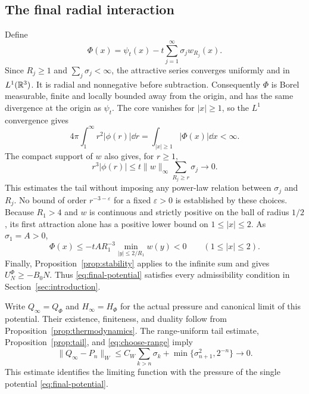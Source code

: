 \subsection{The final radial interaction}
Define
\begin{equation}\label{eq:final-potential}
 \Phi(x)=\psi_t(x)-t\sum_{j=1}^{\infty}\sigma_jw_{R_j}(x).
\end{equation}
Since $R_j\ge1$ and $\sum_j\sigma_j<\infty$, the attractive series
converges uniformly and in $L^1(\mathbb R^3)$. It is radial and nonnegative before
subtraction. Consequently $\Phi$ is Borel measurable, finite and locally
bounded away from the origin, and has the same divergence at the origin as
$\psi_t$. The core vanishes for $|x|\ge1$, so the $L^1$ convergence gives
\[
 4\pi\int_1^\infty r^2|\phi(r)|\dd r
 =\int_{|x|\ge1}|\Phi(x)|\dd x<\infty.
\]
The compact support of $w$ also gives, for $r\ge1$,
\[
 r^3|\phi(r)|\le t\|w\|_\infty\sum_{R_j\ge r}\sigma_j
 \longrightarrow0.
\]
This estimates the tail without imposing any power-law relation between
$\sigma_j$ and $R_j$. No bound of order $r^{-3-\varepsilon}$ for a fixed
$\varepsilon>0$ is established by these choices.
Because $R_1>4$ and $w$ is continuous and strictly positive on the ball of
radius $1/2$, its first attraction alone has a positive lower bound on
$1\le|x|\le2$. As $\sigma_1=A>0$,
\[
 \Phi(x)\le -tA R_1^{-3}
            \min_{|y|\le 2/R_1}w(y)<0
 \qquad(1\le|x|\le2).
\]
Finally, Proposition~\ref{prop:stability} applies to the infinite sum and
gives $U_N^\Phi\ge-B_0N$. Thus \eqref{eq:final-potential} satisfies every
admissibility condition in Section~\ref{sec:introduction}.

Write $Q_\infty=Q_\Phi$ and $H_\infty=H_\Phi$ for the actual pressure and
canonical limit of this potential. Their existence, finiteness, and duality
follow from Proposition~\ref{prop:thermodynamics}. The range-uniform tail
estimate, Proposition~\ref{prop:tail}, and \eqref{eq:choose-range} imply
\begin{equation}\label{eq:physical-pressure-limit}
 \|Q_\infty-P_n\|_W
 \le C_W\sum_{k>n}\sigma_k+\min\{\sigma_{n+1}^2,2^{-n}\}
 \longrightarrow0.
\end{equation}
This estimate identifies the limiting function with the pressure of the
single potential \eqref{eq:final-potential}.

